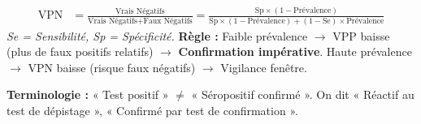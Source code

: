 \documentclass[11pt]{article}
\begin{document}
\begin{methode}
\begin{enumerate}
\begin{align*}
        \text{VPN} &= \frac{\text{Vrais Négatifs}}{\text{Vrais Négatifs} + \text{Faux Négatifs}} = \frac{\text{Sp} \times (1-\text{Prévalence})}{\text{Sp} \times (1-\text{Prévalence}) + (1-\text{Se}) \times \text{Prévalence}}
    \end{align*}
    \textit{Se = Sensibilité, Sp = Spécificité.}
    \textbf{Règle :} Faible prévalence $\rightarrow$ VPP baisse (plus de faux positifs relatifs) $\rightarrow$ \textbf{Confirmation impérative}. Haute prévalence $\rightarrow$ VPN baisse (risque faux négatifs) $\rightarrow$ Vigilance fenêtre.
\end{enumerate}
\textbf{Terminologie :} « Test positif » $\neq$ « Séropositif confirmé ». On dit « Réactif au test de dépistage », « Confirmé par test de confirmation ».
\end{methode}
\end{document}
